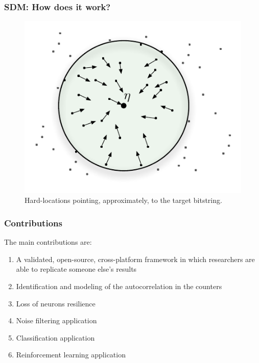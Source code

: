 \documentclass{beamer}
\begin{document}
\begin{frame}
\frametitle{SDM: How does it work?}
\begin{figure}
\centering\includegraphics[scale=0.75]{./images02/p1_after_write.pdf}
\caption{Hard-locations pointing, approximately, to the target bitstring.}
\end{figure}
\end{frame}

\begin{frame}
\frametitle{Contributions}

The main contributions are:
\begin{enumerate}[i]
\item A validated, open-source, cross-platform framework in which researchers are able to replicate someone else's results
\item Identification and modeling of the autocorrelation in the counters
\item Loss of neurons resilience
\item Noise filtering application
\item Classification application
\item Reinforcement learning application
\end{enumerate}
\end{frame}
\end{document}
